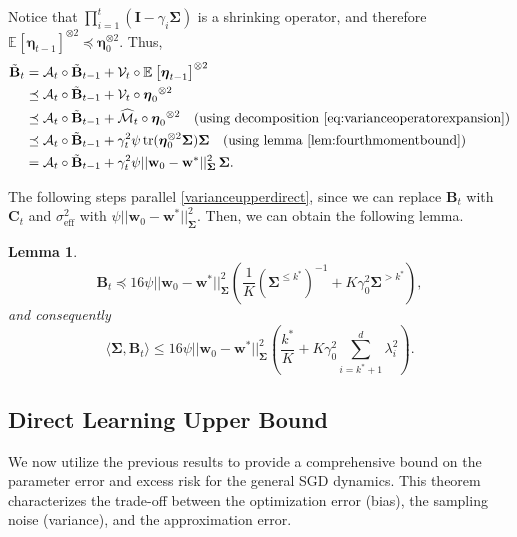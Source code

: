\documentclass{article}
\theoremstyle{definition}
\theoremstyle{definition}
\theoremstyle{plain}
\theoremstyle{plain}
\theoremstyle{plain}
\newtheorem{lemma}{Lemma}
\theoremstyle{plain}
\theoremstyle{plain}
\newcommand{\bs}[1]{\boldsymbol{\mathbf{#1}}}
\newcommand{\mc}[1]{{\mathcal{#1}}}
\newcommand{\tr}{\mathrm{tr}}
\newcommand{\eff}{\mathrm{eff}}
\newcommand{\Sig}{\mathbf{\Sigma}}
\newcommand{\w}{\mathbf{w}}
\newcommand{\id}{\mathbf{I}}
\newcommand{\ex}[2][]{\mathbb{E}_{#1}\left[ #2 \right]}
\begin{document}
Notice that $\prod_{i=1}^t(\id-\gamma_i\bs\Sigma )$ is a shrinking operator, and therefore $\ex{\bs \eta_{t-1}}^{\otimes2}\preceq \bs\eta_0^{\otimes 2}$. Thus,
\begin{equation}
\begin{aligned}
    \tilde{\bs B}_t &= {\mc A}_t \circ \tilde{\bs B}_{t-1} + \mathcal{V}_t\circ \ex{\bs \eta_{t-1}}^{\otimes2}\\
    &\preceq {\mc A}_t \circ \tilde{\bs B}_{t-1} + \mathcal{V}_t\circ {\bs \eta_0}^{\otimes2}\\
    &\preceq {\mc A}_t \circ \tilde{\bs B}_{t-1} + \widehat{\mc M}_t\circ {\bs \eta_0}^{\otimes2}\quad(\text{using decomposition \ref{eq:varianceoperatorexpansion}})\\
    &\preceq {\mc A}_t \circ \tilde{\bs B}_{t-1} +\gamma_t^2\psi \,\tr(\bs\eta_0^{\otimes 2}\bs\Sigma)\bs\Sigma \quad(\text{using lemma \ref{lem:fourthmomentbound}})\\
    &= {\mc A}_t \circ \tilde{\bs B}_{t-1} +\gamma_t^2\psi ||\w_0-\w^*||^2_{\bs\Sigma}\,\bs\Sigma.
\end{aligned}
\end{equation}

The following steps parallel \ref{varianceupperdirect}, since we can replace $\bs B_t$ with $\bs C_t$ and $\sigma^2_\eff$ with $\psi ||\w_0-\w^*||^2_{\bs\Sigma}$. Then, we can obtain the following lemma.

\begin{lemma}
    \begin{equation}
    \bs B_t\preceq 16\psi ||\w_0-\w^*||^2_{\bs\Sigma}\left( \frac{1}{K}(\Sig^{\leq k^*})^{-1}  +K\gamma_0^2 \Sig^{>k^*} \right),
\end{equation}
and consequently
\begin{equation}
    \langle\bs\Sigma,\bs B_t\rangle\leq 16\psi ||\w_0-\w^*||^2_{\bs\Sigma}\left( \frac{k^*}{K}  +K\gamma_0^2 \sum_{i = k^*+1}^{d} \lambda_{i}^2 \right).
\end{equation}
\end{lemma}

\subsection{Direct Learning Upper Bound}
\label{subsec:directupper}
We now utilize the previous results to provide a comprehensive bound on the parameter error and excess risk for the general SGD dynamics. This theorem characterizes the trade-off between the optimization error (bias), the sampling noise (variance), and the approximation error.
\end{document}
